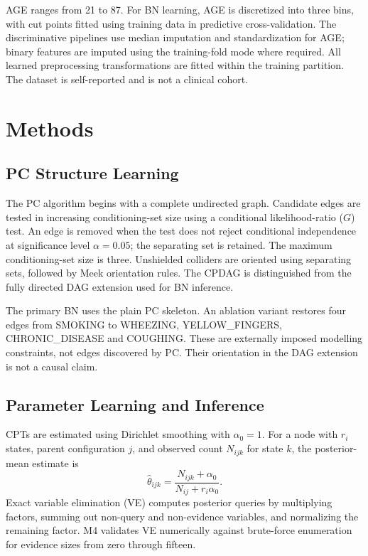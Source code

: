 \documentclass[conference]{IEEEtran}
\begin{document}
AGE ranges from 21 to 87. For BN learning, AGE is discretized into three bins, with cut points fitted using training data in predictive cross-validation. The discriminative pipelines use median imputation and standardization for AGE; binary features are imputed using the training-fold mode where required. All learned preprocessing transformations are fitted within the training partition. The dataset is self-reported and is not a clinical cohort.

\section{Methods}
\subsection{PC Structure Learning}
The PC algorithm begins with a complete undirected graph. Candidate edges are tested in increasing conditioning-set size using a conditional likelihood-ratio ($G$) test. An edge is removed when the test does not reject conditional independence at significance level $\alpha=0.05$; the separating set is retained. The maximum conditioning-set size is three. Unshielded colliders are oriented using separating sets, followed by Meek orientation rules. The CPDAG is distinguished from the fully directed DAG extension used for BN inference.

The primary BN uses the plain PC skeleton. An ablation variant restores four edges from SMOKING to WHEEZING, YELLOW\_FINGERS, CHRONIC\_DISEASE and COUGHING. These are externally imposed modelling constraints, not edges discovered by PC. Their orientation in the DAG extension is not a causal claim.

\subsection{Parameter Learning and Inference}
CPTs are estimated using Dirichlet smoothing with $\alpha_0=1$. For a node with $r_i$ states, parent configuration $j$, and observed count $N_{ijk}$ for state $k$, the posterior-mean estimate is
\begin{equation}
\hat{\theta}_{ijk}=\frac{N_{ijk}+\alpha_0}{N_{ij}+r_i\alpha_0}.
\end{equation}
Exact variable elimination (VE) computes posterior queries by multiplying factors, summing out non-query and non-evidence variables, and normalizing the remaining factor. M4 validates VE numerically against brute-force enumeration for evidence sizes from zero through fifteen.
\end{document}
